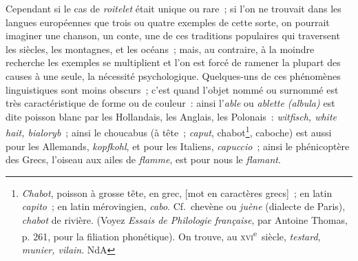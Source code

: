 \documentclass[french,twoside]{book} %
\def\mednobreak{\ifdim\lastskip<\medskipamount
  \removelastskip\nopagebreak\medskip\fi}
\newcommand{\labelblock}[1]{\medbreak{\noindent\color{rubric}\bfseries #1}\par\mednobreak}
\begin{document}
Cependant si le cas de {\itshape roitelet} était unique ou rare ; si l’on ne trouvait dans les langues européennes que trois ou quatre exemples de cette sorte, on pourrait imaginer une chanson, un conte, une de ces traditions populaires qui traversent les siècles, les montagnes, et les océans ; mais, au contraire, à la moindre recherche les exemples se multiplient et l’on est forcé de ramener la plupart des causes à une seule, la nécessité psychologique. Quelques-uns de ces phénomènes linguistiques sont moins obscurs ; c’est quand l’objet nommé ou surnommé est très caractéristique de forme ou de couleur : ainsi l’{\itshape able} ou {\itshape ablette (albula)} est dite poisson blanc par les Hollandais, les Anglais, les Polonais : {\itshape witfisch, white hait, bialoryb} ; ainsi le choucabus (à tête ; {\itshape caput}, chabot\footnote{ {\itshape Chabot}, poisson à grosse tête, en grec, [mot en caractères grecs] ; en latin {\itshape capito} ; en latin mérovingien, {\itshape cabo}. Cf. chevène ou {\itshape juène} (dialecte de Paris), {\itshape chabot} de rivière. (Voyez {\itshape Essais de Philologie française}, par Antoine Thomas, p. 261, pour la filiation phonétique). On trouve, au \textsc{xvi}\textsuperscript{e} siècle, {\itshape testard, munier, vilain}. NdA}, caboche) est aussi pour les Allemands, {\itshape kopfkohl}, et pour les Italiens, {\itshape capuccio} ; ainsi le phénicoptère des Grecs, l’oiseau aux ailes de {\itshape flamme}, est pour nous le {\itshape flamant}.\par

\labelblock{{\itshape Lézard.}}
\end{document}
